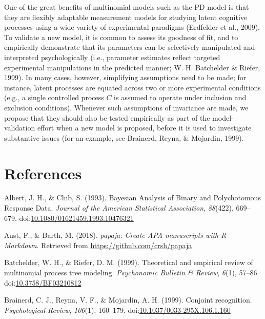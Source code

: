 \documentclass[floatsintext,doc]{apa6}
\theoremstyle{definition}
\theoremstyle{definition}
\theoremstyle{definition}
\theoremstyle{remark}
\begin{document}
One of the great benefits of multinomial models such as the PD model is
that they are flexibly adaptable measurement models for studying latent
cognitive processes using a wide variety of experimental paradigms
(Erdfelder et al., 2009). To validate a new model, it is common to
assess its goodness of fit, and to empirically demonstrate that its
parameters can be selectively manipulated and interpreted
psychologically (i.e., parameter estimates reflect targeted experimental
manipulations in the predicted manner; W. H. Batchelder \& Riefer,
1999). In many cases, however, simplifying assumptions need to be made;
for instance, latent processes are equated across two or more
experimental conditions (e.g., a single controlled process \(C\) is
assumed to operate under inclusion and exclusion conditions). Whenever
such assumptions of invariance are made, we propose that they should
also be tested empirically as part of the model-validation effort when a
new model is proposed, before it is used to investigate substantive
issues (for an example, see Brainerd, Reyna, \& Mojardin, 1999).

\clearpage

\section{References}\label{references}

\setlength{\parindent}{-0.5in} \setlength{\leftskip}{0.5in}
\setlength{\parskip}{8pt}

\hypertarget{refs}{}
\hypertarget{ref-albert_bayesian_1993}{}
Albert, J. H., \& Chib, S. (1993). Bayesian Analysis of Binary and
Polychotomous Response Data. \emph{Journal of the American Statistical
Association}, \emph{88}(422), 669--679.
doi:\href{https://doi.org/10.1080/01621459.1993.10476321}{10.1080/01621459.1993.10476321}

\hypertarget{ref-R-papaja}{}
Aust, F., \& Barth, M. (2018). \emph{papaja: Create APA manuscripts with
R Markdown}. Retrieved from \url{https://github.com/crsh/papaja}

\hypertarget{ref-batchelder_theoretical_1999}{}
Batchelder, W. H., \& Riefer, D. M. (1999). Theoretical and empirical
review of multinomial process tree modeling. \emph{Psychonomic Bulletin
\& Review}, \emph{6}(1), 57--86.
doi:\href{https://doi.org/10.3758/BF03210812}{10.3758/BF03210812}

\hypertarget{ref-brainerd_conjoint_1999}{}
Brainerd, C. J., Reyna, V. F., \& Mojardin, A. H. (1999). Conjoint
recognition. \emph{Psychological Review}, \emph{106}(1), 160--179.
doi:\href{https://doi.org/10.1037/0033-295X.106.1.160}{10.1037/0033-295X.106.1.160}
\end{document}
